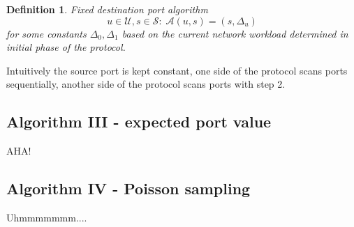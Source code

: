 \documentclass[twoside]{article}
\newtheorem{mydef}{Definition}
\begin{document}
\begin{multicols}{2}
\begin{mydef}
Fixed destination port algorithm
\[
u \in \mathcal{U}, s \in \mathcal{S}: \;
\mathcal{A}(u, s) = (s, \Delta_u)
\] for some constants $\Delta_0, \Delta_1$ based on the current network workload determined in initial phase
of the protocol.
\end{mydef}

Intuitively the source port is kept constant, one side of the protocol scans ports sequentially, another
side of the protocol scans ports with step 2.

\subsection{Algorithm III - expected port value}
AHA!

\subsection{Algorithm IV - Poisson sampling}
Uhmmmmmmm....





\end{multicols}
\end{document}
